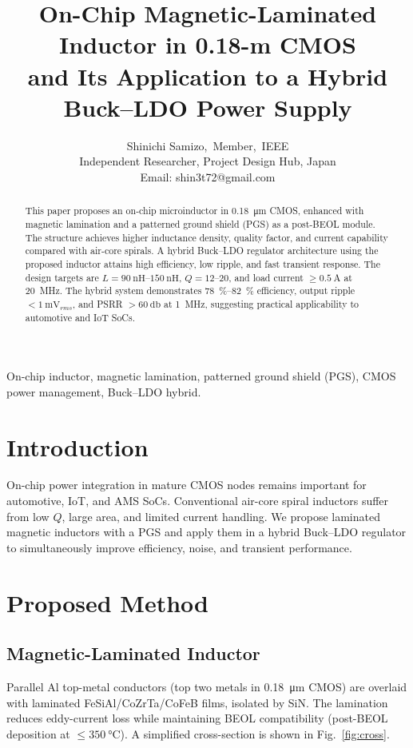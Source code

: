 \documentclass[journal]{IEEEtran}
\title{On-Chip Magnetic-Laminated Inductor in 0.18-\textmu m CMOS\\
and Its Application to a Hybrid Buck--LDO Power Supply}
\author{Shinichi Samizo,~Member,~IEEE\\
Independent Researcher, Project Design Hub, Japan\\
Email: shin3t72@gmail.com}
\begin{document}
\maketitle

\begin{abstract}
This paper proposes an on-chip microinductor in \SI{0.18}{\um} CMOS, enhanced with magnetic lamination and a patterned ground shield (PGS) as a post-BEOL module. The structure achieves higher inductance density, quality factor, and current capability compared with air-core spirals. A hybrid Buck--LDO regulator architecture using the proposed inductor attains high efficiency, low ripple, and fast transient response. The design targets are $L=\SIrange{90}{150}{\nano\henry}$, $Q=\numrange{12}{20}$, and load current $\ge\SI{0.5}{\ampere}$ at \SI{20}{\mega\hertz}. The hybrid system demonstrates \SIrange{78}{82}{\percent} efficiency, output ripple $<\SI{1}{\milli\volt_{rms}}$, and PSRR $>\SI{60}{\decibel}$ at \SI{1}{\mega\hertz}, suggesting practical applicability to automotive and IoT SoCs.
\end{abstract}

\begin{IEEEkeywords}
On-chip inductor, magnetic lamination, patterned ground shield (PGS), CMOS power management, Buck--LDO hybrid.
\end{IEEEkeywords}

\section{Introduction}
On-chip power integration in mature CMOS nodes remains important for automotive, IoT, and AMS SoCs. Conventional air-core spiral inductors suffer from low $Q$, large area, and limited current handling. We propose laminated magnetic inductors with a PGS and apply them in a hybrid Buck--LDO regulator to simultaneously improve efficiency, noise, and transient performance.

\section{Proposed Method}
\subsection{Magnetic-Laminated Inductor}
Parallel Al top-metal conductors (top two metals in \SI{0.18}{\um} CMOS) are overlaid with laminated FeSiAl/CoZrTa/CoFeB films, isolated by SiN. The lamination reduces eddy-current loss while maintaining BEOL compatibility (post-BEOL deposition at $\le\SI{350}{\celsius}$). A simplified cross-section is shown in Fig.~\ref{fig:cross}.
\end{document}
